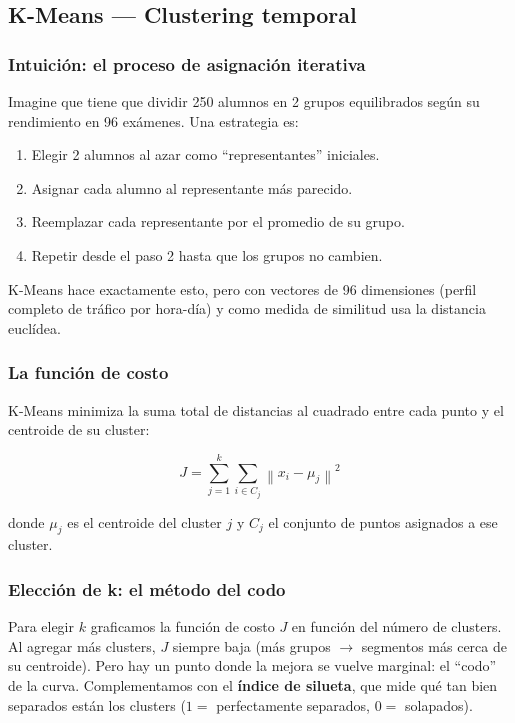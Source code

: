 \documentclass[12pt,a4paper]{article}
\begin{document}
\subsection{K-Means --- Clustering temporal}

\subsubsection{Intuición: el proceso de asignación iterativa}

Imagine que tiene que dividir 250 alumnos en 2 grupos equilibrados según
su rendimiento en 96 exámenes.
Una estrategia es:
\begin{enumerate}[noitemsep]
  \item Elegir 2 alumnos al azar como ``representantes'' iniciales.
  \item Asignar cada alumno al representante más parecido.
  \item Reemplazar cada representante por el promedio de su grupo.
  \item Repetir desde el paso 2 hasta que los grupos no cambien.
\end{enumerate}

K-Means hace exactamente esto, pero con vectores de 96 dimensiones
(perfil completo de tráfico por hora-día) y como medida de similitud
usa la distancia euclídea.

\subsubsection{La función de costo}

K-Means minimiza la suma total de distancias al cuadrado entre cada punto
y el centroide de su cluster:

\begin{equation}
  J = \sum_{j=1}^{k} \sum_{i \in C_j}
  \left\| x_i - \mu_j \right\|^2
  \label{eq:kmeans}
\end{equation}

donde $\mu_j$ es el centroide del cluster $j$ y $C_j$ el conjunto de
puntos asignados a ese cluster.

\subsubsection{Elección de k: el método del codo}

Para elegir $k$ graficamos la función de costo $J$ en función del número
de clusters.
Al agregar más clusters, $J$ siempre baja (más grupos $\to$ segmentos
más cerca de su centroide).
Pero hay un punto donde la mejora se vuelve marginal: el ``codo'' de la
curva.
Complementamos con el \textbf{índice de silueta}, que mide qué tan bien
separados están los clusters ($1 = $ perfectamente separados, $0 = $ solapados).
\end{document}
